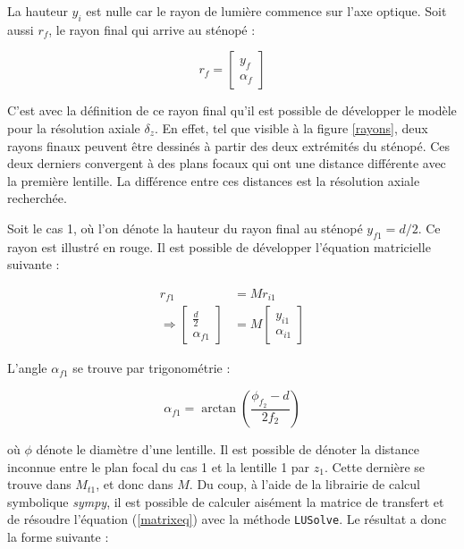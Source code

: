 \documentclass[11pt,letterpaper]{article}
\begin{document}
La hauteur $y_{i}$ est nulle car le rayon de lumière commence sur l'axe optique. Soit aussi $r_{f}$, le rayon final qui arrive au sténopé :

\begin{equation}
  r_{f}= 
  \begin{bmatrix}
    y_{f} \\
    \alpha_{f}
  \end{bmatrix}
\end{equation}

C'est avec la définition de ce rayon final qu'il est possible de développer le modèle pour la résolution axiale $\delta_{z}$. En effet, tel que visible à la figure \ref{rayons}, deux rayons finaux peuvent être dessinés à partir des deux extrémités du sténopé. Ces deux derniers convergent à des plans focaux qui ont une distance différente avec la première lentille. La différence entre ces distances est la résolution axiale recherchée.

Soit le cas 1, où l'on dénote la hauteur du rayon final au sténopé $y_{f1} = d/2$. Ce rayon est illustré en rouge. Il est possible de développer l'équation matricielle suivante :

\begin{align}
  r_{f1}&= M r_{i1}\label{matrixeq}\\
  \Rightarrow\begin{bmatrix}
    \frac{d}{2}  \\
    \alpha_{f1}
  \end{bmatrix} &= 
  M \begin{bmatrix}
    y_{i1} \\
    \alpha_{i1}
  \end{bmatrix}
\end{align}

L'angle $\alpha_{f1}$ se trouve par trigonométrie :

\begin{equation}
  \alpha_{f1}= \arctan\left( \frac{\phi_{f_{2}}-d}{2f_{2}} \right)
\end{equation}

où $\phi$ dénote le diamètre d'une lentille. Il est possible de dénoter la distance inconnue entre le plan focal du cas 1 et la lentille 1 par $z_{1}$. Cette dernière se trouve dans $M_{t1}$, et donc dans $M$. Du coup, à l'aide de la librairie de calcul symbolique \textit{sympy}, il est possible de calculer aisément la matrice de transfert et de résoudre l'équation (\ref{matrixeq}) avec la méthode \texttt{LUSolve}. Le résultat a donc la forme suivante :
\end{document}
